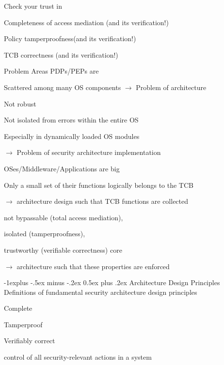 \documentclass[a4paper]{article}
\makeatletter
\renewcommand{\subsection}{\@startsection{subsection}{2}{0mm}%
                {-1explus -.5ex minus -.2ex}%
                {0.5ex plus .2ex}%
                {\normalfont\normalsize\bfseries}}
\makeatother
\begin{document}
\begin{multicols}{3}
    Check your trust in
    \begin{itemize*}
        \item Completeness of access mediation (and its verification!)
        \item Policy tamperproofness(and its verification!)
        \item TCB correctness (and its verification!)
    \end{itemize*}

    Problem Areas PDPs/PEPs are
    \begin{itemize*}
        \item Scattered among many OS components $\rightarrow$ Problem of architecture
        \item Not robust
        \begin{itemize*}
            \item Not isolated from errors within the entire OS
            \item Especially in dynamically loaded OS modules
            \item[$\rightarrow$] Problem of security architecture implementation
        \end{itemize*}
        \item OSes/Middleware/Applications are big
        \item Only a small set of their functions logically belongs to the TCB
        \item[$\rightarrow$] architecture design such that TCB functions are collected
        \begin{itemize*}
            \item not bypassable (total access mediation),
            \item isolated (tamperproofness),
            \item trustworthy (verifiable correctness) core
            \item[$\rightarrow$] architecture such that these properties are enforced
        \end{itemize*}
    \end{itemize*}

    \subsection{Architecture Design Principles}
    Definitions of fundamental security architecture design principles
    \begin{itemize*}
        \item Complete
        \item Tamperproof
        \item Verifiably correct
        \item control of all security-relevant actions in a system
    \end{itemize*}


\end{multicols}
\end{document}

